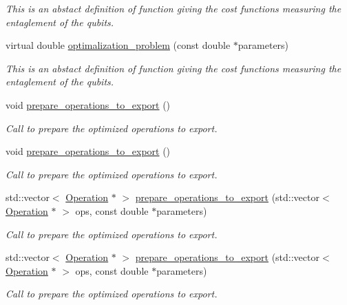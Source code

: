 \begin{DoxyCompactItemize}
\begin{DoxyCompactList}\small\item\em This is an abstact definition of function giving the cost functions measuring the entaglement of the qubits. \end{DoxyCompactList}\item 
virtual double \hyperlink{class_decomposition___base_a274b510011ebbc14c8acb67d844a5aef}{optimalization\+\_\+problem} (const double $\ast$parameters)
\begin{DoxyCompactList}\small\item\em This is an abstact definition of function giving the cost functions measuring the entaglement of the qubits. \end{DoxyCompactList}\item 
void \hyperlink{class_decomposition___base_a965838902240670119c0ad68d087c322}{prepare\+\_\+operations\+\_\+to\+\_\+export} ()
\begin{DoxyCompactList}\small\item\em Call to prepare the optimized operations to export. \end{DoxyCompactList}\item 
void \hyperlink{class_decomposition___base_a965838902240670119c0ad68d087c322}{prepare\+\_\+operations\+\_\+to\+\_\+export} ()
\begin{DoxyCompactList}\small\item\em Call to prepare the optimized operations to export. \end{DoxyCompactList}\item 
std\+::vector$<$ \hyperlink{class_operation}{Operation} $\ast$ $>$ \hyperlink{class_decomposition___base_a3efce739eaf575d284156813436bb469}{prepare\+\_\+operations\+\_\+to\+\_\+export} (std\+::vector$<$ \hyperlink{class_operation}{Operation} $\ast$ $>$ ops, const double $\ast$parameters)
\begin{DoxyCompactList}\small\item\em Call to prepare the optimized operations to export. \end{DoxyCompactList}\item 
std\+::vector$<$ \hyperlink{class_operation}{Operation} $\ast$ $>$ \hyperlink{class_decomposition___base_a68dcc2cdfa644cf8043021367cc07d28}{prepare\+\_\+operations\+\_\+to\+\_\+export} (std\+::vector$<$ \hyperlink{class_operation}{Operation} $\ast$ $>$ ops, const double $\ast$parameters)
\begin{DoxyCompactList}\small\item\em Call to prepare the optimized operations to export. \end{DoxyCompactList}\item 

\end{DoxyCompactItemize}
